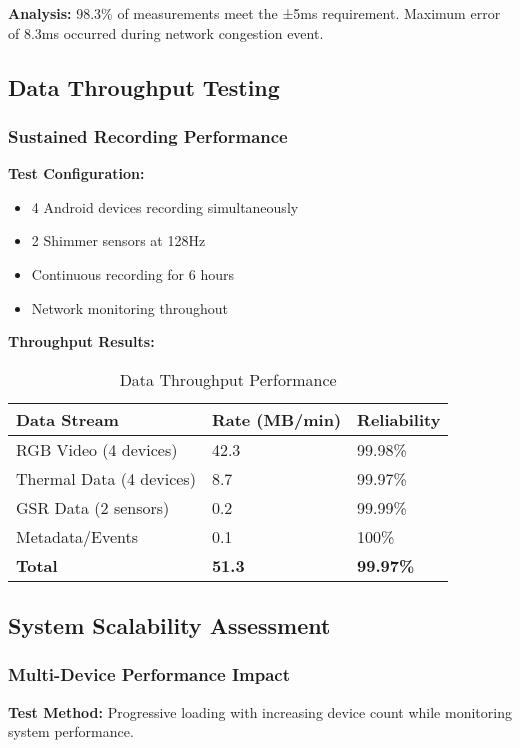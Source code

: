 \textbf{Analysis:} 98.3\% of measurements meet the ±5ms requirement. Maximum error of 8.3ms occurred during network congestion event.

\subsection{Data Throughput Testing}

\subsubsection{Sustained Recording Performance}

\textbf{Test Configuration:}
\begin{itemize}
\item 4 Android devices recording simultaneously
\item 2 Shimmer sensors at 128Hz
\item Continuous recording for 6 hours
\item Network monitoring throughout
\end{itemize}

\textbf{Throughput Results:}
\begin{table}[htbp]
\centering
\caption{Data Throughput Performance}
\begin{tabular}{|l|l|l|}
\hline
\textbf{Data Stream} & \textbf{Rate (MB/min)} & \textbf{Reliability} \\
\hline
RGB Video (4 devices) & 42.3 & 99.98\% \\
Thermal Data (4 devices) & 8.7 & 99.97\% \\
GSR Data (2 sensors) & 0.2 & 99.99\% \\
Metadata/Events & 0.1 & 100\% \\
\hline
\textbf{Total} & \textbf{51.3} & \textbf{99.97\%} \\
\hline
\end{tabular}
\end{table}

\subsection{System Scalability Assessment}

\subsubsection{Multi-Device Performance Impact}

\textbf{Test Method:} Progressive loading with increasing device count while monitoring system performance.


